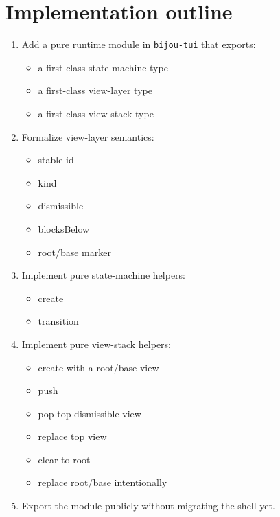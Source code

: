 \section{Implementation outline}\label{record-150-implementation-outline}

\begin{enumerate}
\def\labelenumi{\arabic{enumi}.}
\tightlist
\item
  Add a pure runtime module in \texttt{b\allowbreak{}i\allowbreak{}j\allowbreak{}o\allowbreak{}u\allowbreak{}-\allowbreak{}t\allowbreak{}u\allowbreak{}i} that exports:

  \begin{itemize}
  \tightlist
  \item
    a first-class state-machine type
  \item
    a first-class view-layer type
  \item
    a first-class view-stack type
  \end{itemize}
\item
  Formalize view-layer semantics:

  \begin{itemize}
  \tightlist
  \item
    stable id
  \item
    kind
  \item
    dismissible
  \item
    blocksBelow
  \item
    root/base marker
  \end{itemize}
\item
  Implement pure state-machine helpers:

  \begin{itemize}
  \tightlist
  \item
    create
  \item
    transition
  \end{itemize}
\item
  Implement pure view-stack helpers:

  \begin{itemize}
  \tightlist
  \item
    create with a root/base view
  \item
    push
  \item
    pop top dismissible view
  \item
    replace top view
  \item
    clear to root
  \item
    replace root/base intentionally
  \end{itemize}
\item
  Export the module publicly without migrating the shell yet.
\end{enumerate}

